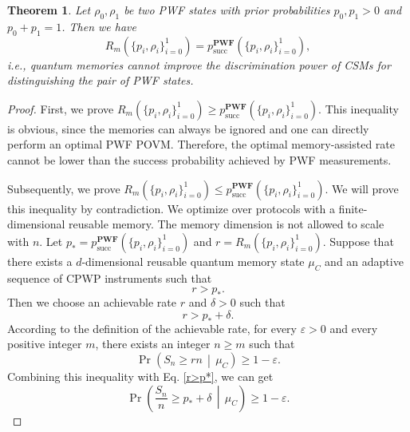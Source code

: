 \documentclass[aps,pra,twocolumn,floatfix,amsfonts,10pt]{revtex4-2}
\newtheorem{theorem}{Theorem}
\begin{document}
\begin{theorem}\label{theorem 3}
	Let $\rho_0,\rho_1$ be two PWF states with prior probabilities $p_0,p_1>0$ and $p_0+p_1=1$. 
	Then we have
	\begin{equation}
		R_m\left(\{p_i,\rho_i\}_{i=0}^{1}\right) = p_{\mathrm{succ}}^{\mathbf{PWF}}\left(\{p_i,\rho_i\}_{i=0}^{1}\right),
	\end{equation}
	i.e., quantum memories cannot improve the discrimination power of CSMs for distinguishing the pair of PWF states.
\end{theorem}

\begin{proof}
	First, we prove $R_m\left(\{p_i,\rho_i\}_{i=0}^{1}\right) \geqslant p_{\mathrm{succ}}^{\mathbf{PWF}}\left(\{p_i,\rho_i\}_{i=0}^{1}\right)$.
	This inequality is obvious, since the memories can always be ignored and one can directly perform an optimal PWF POVM. 
	Therefore, the optimal memory-assisted rate cannot be lower than the success probability achieved by PWF measurements.
	
	Subsequently, we prove $R_m\left(\{p_i,\rho_i\}_{i=0}^{1}\right) \leqslant p_{\mathrm{succ}}^{\mathbf{PWF}}\left(\{p_i,\rho_i\}_{i=0}^{1}\right)$.
	We will prove this inequality by contradiction.
	We optimize over protocols with a finite-dimensional reusable memory. 
	The memory dimension is not allowed to scale with $n$.
	Let $p_* = p_{\mathrm{succ}}^{\mathbf{PWF}} \left(\{p_i,\rho_i\}_{i=0}^{1}\right)$ and $r = R_m\left(\{p_i,\rho_i\}_{i=0}^{1}\right)$.
	Suppose that there exists a $d$-dimensional reusable quantum memory state $\mu_C$ and an adaptive sequence of CPWP instruments such that
	\begin{equation}
		r>p_*.
	\end{equation}
	Then we choose an achievable rate $r$ and $\delta>0$ such that
	\begin{equation}\label{r>p*}
		r>p_*+\delta.
	\end{equation}
	According to the definition of the achievable rate, for every $\varepsilon>0$ and every positive integer $m$, there exists an integer $n\geqslant m$ such that
	\begin{equation}
		\Pr\left(S_n\geqslant rn\,\middle|\,\mu_C\right) \geqslant 1-\varepsilon.
	\end{equation}
	Combining this inequality with Eq. \eqref{r>p*}, we can get
	\begin{equation}\label{memory probability}
		\Pr\left(\frac{S_n}{n}\geqslant p_*+\delta\,\middle|\, \mu_C \right) \geqslant 1-\varepsilon.
	\end{equation}
	

\end{proof}
\end{document}

